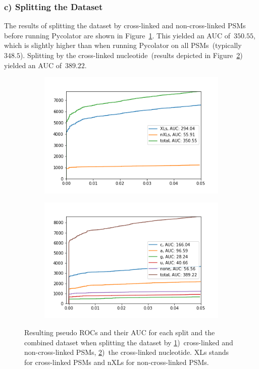 \subsubsection{c) Splitting the Dataset}
\label{lab:results:splitting}
The results of splitting the dataset by cross-linked and non-cross-linked PSMs before running Pycolator are shown in Figure~\ref{fig:results:splitting_xl}. This yielded an AUC of~$350.55$, which is slightly higher than when running Pycolator on all PSMs~(typically $348.5$). Splitting by the cross-linked nucleotide~(results depicted in Figure~\ref{fig:results:splitting_bases}) yielded an AUC of~$389.22$.
\renewcommand{\baselinestretch}{0.9}
\begin{figure}
	\normalsize
	\centering
	\begin{subfigure}{0.49 \textwidth}
		\includegraphics[width = \textwidth]{figures/split_by_xl.png}
		\caption{}
		\label{fig:results:splitting_xl}
	\end{subfigure}
	\hfill
	\begin{subfigure}{0.49 \textwidth}
		\includegraphics[width = \textwidth]{figures/split_by_bases.png}
		\caption{}
		\label{fig:results:splitting_bases}
	\end{subfigure}
	\caption[Model performance after splitting the dataset]{Resulting pseudo ROCs and their AUC for each split and the combined dataset when splitting the dataset by \ref{fig:results:splitting_xl})~cross-linked and non-cross-linked PSMs, \ref{fig:results:splitting_bases})~the cross-linked nucleotide. XLs stands for cross-linked PSMs and nXLs for non-cross-linked PSMs.}
	\label{fig:results:splitting}
\end{figure}
